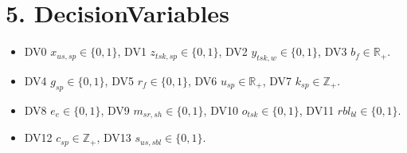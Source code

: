\documentclass[11pt,a4paper]{article}
\begin{document}
\section{5. DecisionVariables}
\begin{itemize}
  \item DV0 $x_{us,sp}\in\{0,1\}$, DV1 $z_{tsk,sp}\in\{0,1\}$, DV2 $y_{tsk,w}\in\{0,1\}$, DV3 $b_f\in\mathbb{R}_{+}$.
  \item DV4 $g_{sp}\in\{0,1\}$, DV5 $r_f\in\{0,1\}$, DV6 $u_{sp}\in\mathbb{R}_{+}$, DV7 $k_{sp}\in\mathbb{Z}_{+}$.
  \item DV8 $e_{e}\in\{0,1\}$, DV9 $m_{sr,sh}\in\{0,1\}$, DV10 $o_{tsk}\in\{0,1\}$, DV11 $rbl_{bl}\in\{0,1\}$.
  \item DV12 $c_{sp}\in\mathbb{Z}_{+}$, DV13 $s_{us,sbl}\in\{0,1\}$.
\end{itemize}
\end{document}
